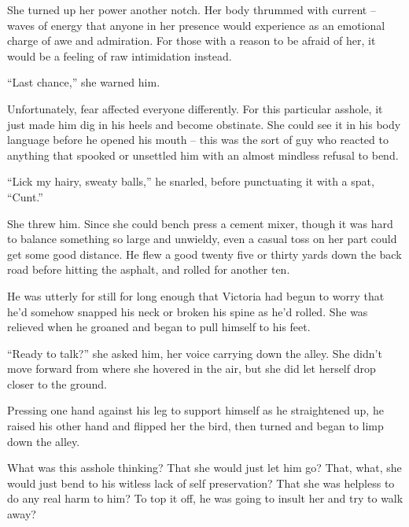 She turned up her power another notch.  Her body thrummed with current – waves of energy that anyone in her presence would experience as an emotional charge of awe and admiration.  For those with a reason to be afraid of her, it would be a feeling of raw intimidation instead.



``Last chance,'' she warned him.



Unfortunately, fear affected everyone differently.  For this particular asshole, it just made him dig in his heels and become obstinate.  She could see it in his body language before he opened his mouth – this was the sort of guy who reacted to anything that spooked or unsettled him with an almost mindless refusal to bend.



``Lick my hairy, sweaty balls,'' he snarled, before punctuating it with a spat, ``Cunt.''



She threw him.  Since she could bench press a cement mixer, though it was hard to balance something so large and unwieldy, even a casual toss on her part could get some good distance.  He flew a good twenty five or thirty yards down the back road before hitting the asphalt, and rolled for another ten.



He was utterly for still for long enough that Victoria had begun to worry that he'd somehow snapped his neck or broken his spine as he'd rolled.  She was relieved when he groaned and began to pull himself to his feet.



``Ready to talk?'' she asked him, her voice carrying down the alley.  She didn't move  forward from where she hovered in the air, but she did let herself drop closer to the ground.



Pressing one hand against his leg to support himself as he straightened up, he raised his other hand and flipped her the bird, then turned and began to limp down the alley.



What was this asshole thinking?  That she would just let him go?  That, what, she would just bend to his witless lack of self preservation?  That she was helpless to do any real harm to him?  To top it off, he was going to insult her and try to walk away?




